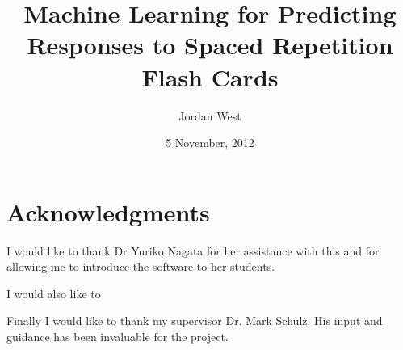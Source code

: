 \documentclass[a4paper]{article}
\title{Machine Learning for Predicting Responses to Spaced Repetition Flash Cards}
\date{5 November, 2012}
\author{Jordan West}
\begin{document}


\tableofcontents
\newpage











\section{Acknowledgments}
I would like to thank Dr Yuriko Nagata for her assistance with this and for allowing
me to introduce the software to her students.

I would also like to 

Finally I would like to thank my supervisor Dr. Mark Schulz. His input and guidance
has been invaluable for the project. 
\end{document}
